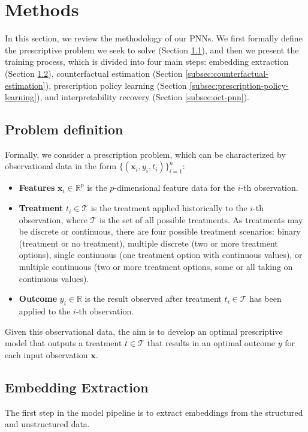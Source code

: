 \documentclass[10pt]{article} %
\begin{document}
\section{Methods}\label{sec:methods}

In this section, we review the methodology of our PNNs. We first formally define the prescriptive problem we seek to solve (Section \ref{subsec:problem_definition}), and then we present the training process, which is divided into four main steps: embedding extraction (Section \ref{subsec:embedding-extract}), counterfactual estimation (Section \ref{subsec:counterfactual-estimation}), prescription policy learning (Section \ref{subsec:prescription-policy-learning}), and interpretability recovery (Section \ref{subsec:oct-pnn}). 

\subsection{Problem definition}\label{subsec:problem_definition}

Formally, we consider a prescription problem, which can be characterized by observational data in the form $\{(\boldsymbol{x}_i,y_i,t_i)\}_{i=1}^n$:
\begin{itemize}
    \item \textbf{Features} $\boldsymbol{x}_{i}\in\mathbb{R}^p$ is the $p$-dimensional feature data for the $i$-th observation.
    \item \textbf{Treatment} $t_i\in\mathcal{T}$ is the treatment applied historically to the $i$-th observation, where $\mathcal{T}$ is the set of all possible treatments. As treatments may be discrete or continuous, there are four possible treatment scenarios: binary (treatment or no treatment), multiple discrete (two or more treatment options), single continuous (one treatment option with continuous values), or multiple continuous (two or more treatment options, some or all taking on continuous values). 
    \item \textbf{Outcome} $y_{i}\in\mathbb{R}$ is the result observed after treatment $t_i \in \mathcal{T}$ has been applied to the $i$-th observation. 
\end{itemize}
Given this observational data, the aim is to develop an optimal prescriptive model that outputs a treatment $t\in\mathcal{T}$ that results in an optimal outcome $y$ for each input observation $\boldsymbol{x}$. 

\subsection{Embedding Extraction}\label{subsec:embedding-extract}
The first step in the model pipeline is to extract embeddings from the structured and unstructured data.
\end{document}
